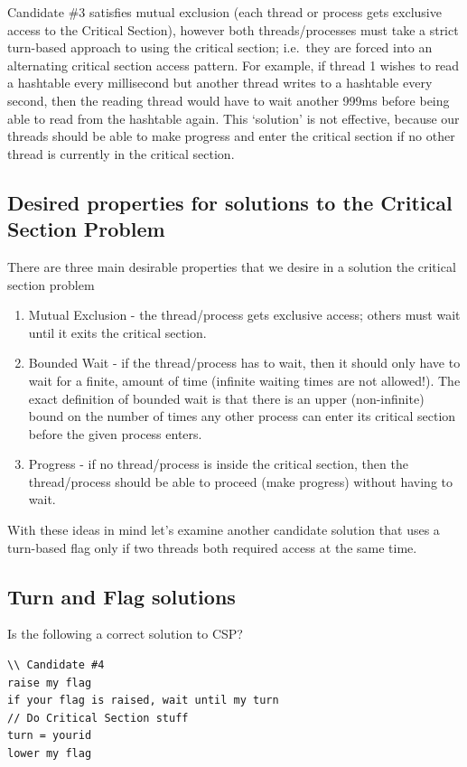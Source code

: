 Candidate \#3 satisfies mutual exclusion (each thread or process gets exclusive access to the Critical Section), however both threads/processes must take a strict turn-based approach to using the critical section; i.e.~they are forced into an alternating critical section access pattern. For example, if thread 1 wishes to read a hashtable every millisecond but another thread writes to a hashtable every second, then the reading thread would have to wait another 999ms before being able to read from the hashtable again. This `solution' is not effective, because our threads should be able to make progress and enter the critical section if no other thread is currently in the critical section.

\subsection{Desired properties for solutions to the Critical Section Problem}

There are three main desirable properties that we desire in a solution the critical section problem

\begin{enumerate}
\item Mutual Exclusion - the thread/process gets exclusive access; others must wait until it exits the critical section.
\item Bounded Wait - if the thread/process has to wait, then it should only have to wait for a finite, amount of time (infinite waiting times are not allowed!). The exact definition of bounded wait is that there is an upper (non-infinite) bound on the number of times any other process can enter its critical section before the given process enters.
\item Progress - if no thread/process is inside the critical section, then the thread/process should be able to proceed (make progress) without having to wait.
\end{enumerate}

With these ideas in mind let's examine another candidate solution that uses a turn-based flag only if two threads both required access at the same time.

\subsection{Turn and Flag solutions}

Is the following a correct solution to CSP?

\begin{lstlisting}
\\ Candidate #4
raise my flag
if your flag is raised, wait until my turn
// Do Critical Section stuff
turn = yourid
lower my flag
\end{lstlisting}

